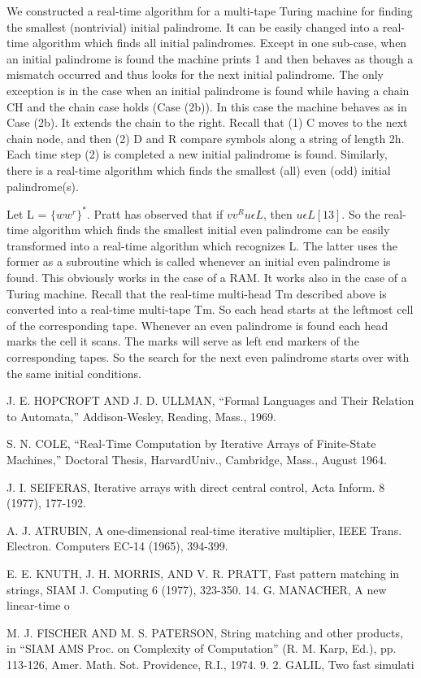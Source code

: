 \documentclass[11pt,a4paper]{report}
\begin{document}
We constructed a real-time algorithm for a multi-tape Turing machine for finding the
smallest (nontrivial) initial palindrome. It can be easily changed into a real-time algorithm
which finds all initial palindromes. Except in one sub-case, when an initial palindrome is
found the machine prints 1 and then behaves as though a mismatch occurred and thus
looks for the next initial palindrome. The only exception is in the case when an initial
palindrome is found while having a chain CH and the chain case holds (Case (2b)).
In this case the machine behaves as in Case (2b). It extends the chain to the right. Recall
that (1) C moves to the next chain node, and then (2) D and R compare symbols along a
string of length 2h. Each time step (2) is completed a new initial palindrome is found.
Similarly, there is a real-time algorithm which finds the smallest (all) even (odd) initial
palindrome(s).

Let L = $\{ww^r\}^*$. Pratt has observed that if $vv^Ru \epsilon  L$, then $u \epsilon L [13]$. So the real-time
algorithm which finds the smallest initial even palindrome can be easily transformed into
a real-time algorithm which recognizes L. The latter uses the former as a subroutine 
which is called whenever an initial even palindrome is found. This obviously works in
the case of a RAM. It works also in the case of a Turing machine. Recall that the real-time
multi-head Tm described above is converted into a real-time multi-tape Tm. So each
head starts at the leftmost cell of the corresponding tape. Whenever an even palindrome is
found each head marks the cell it scans. The marks will serve as left end markers of the
corresponding tapes. So the search for the next even palindrome starts over with the same
initial conditions. 


\begin{thebibliography}{9}
    J. E. HOPCROFT AND J. D. ULLMAN, “Formal Languages and Their Relation to Automata,” Addison-Wesley, Reading, Mass., 1969.

    S. N. COLE, “Real-Time Computation by Iterative Arrays of Finite-State Machines,” Doctoral Thesis, HarvardUniv., Cambridge, Mass., August 1964.

    J. I. SEIFERAS, Iterative arrays with direct central control, Acta Inform. 8 (1977), 177-192.

    A. J. ATRUBIN, A one-dimensional real-time iterative multiplier, IEEE Trans. Electron. Computers EC-14 (1965), 394-399. 

    E. E. KNUTH, J. H. MORRIS, AND V. R. PRATT, Fast pattern matching in strings, SIAM J. Computing 6 (1977), 323-350. 14. G. MANACHER, A new linear-time o

    M. J. FISCHER AND M. S. PATERSON, String matching and other products, in “SIAM AMS Proc. on Complexity of Computation” (R. M. Karp, Ed.), pp. 113-126, Amer. Math. Sot. Providence, R.I., 1974. 9. 2. GALIL, Two fast simulati

\end{thebibliography}
\end{document}
